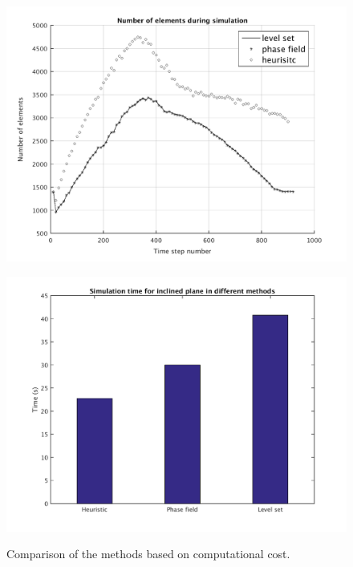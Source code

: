 \documentclass[letterpaper,10pt]{article}
\begin{document}
  
\begin{figure}[H]
        \begin{minipage}[b]{.5\linewidth}
                \centering
                \includegraphics[scale=0.45]{IMAGES/incline_num_elem.png}
                \label{mesh_inc}
                
        \end{minipage}
        \begin{minipage}[b]{.5 \linewidth}
                \centering
                \includegraphics[scale=0.45]{IMAGES/incline_timing1.png}
                \label{barplot_inc}
                
        \end{minipage}
        \caption{Comparison of the methods based on computational cost.}
        \label{compinc_comput}
\end{figure}
\end{document}
